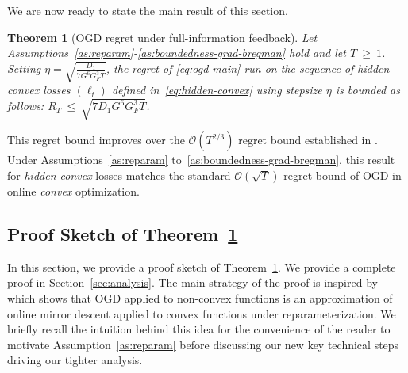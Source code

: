 \documentclass[a4paper,11pt,fullpage]{article}
\theoremstyle{plain}
\newtheorem{theorem}{Theorem}
\theoremstyle{definition}
\theoremstyle{plain}
\renewcommand{\leq}{~\le~}
\renewcommand{\geq}{~\ge~}
\begin{document}
We are now ready to state the main result of this section.

\begin{tcolorbox}[colframe=white!, top=2pt,left=2pt,right=2pt,bottom=2pt] 
\begin{theorem}[OGD regret under full-information feedback]
\label{thm:main}
Let Assumptions~\ref{as:reparam}-\ref{as:boundedness-grad-bregman} hold and let $T \geq 1$. Setting $\eta = \sqrt{\frac{D_1}{7 G^6 G_F^3 T}}$, 
the regret of \eqref{eq:ogd-main} run on the sequence of hidden-convex losses $(\ell_t)$ defined in~\eqref{eq:hidden-convex} using stepsize $\eta$ is bounded as follows: 
$R_T \leq \sqrt{7 D_1 G^6 G_F^3 T}$.
\end{theorem}
\end{tcolorbox}

This regret bound improves over the $\mathcal{O}(T^{2/3})$ regret bound established in \citet{ghai-lu-hazan22}. 
Under Assumptions~\ref{as:reparam} to~\ref{as:boundedness-grad-bregman}, this result for \textit{hidden-convex} losses matches the standard $\mathcal{O}(\sqrt{T})$ regret bound of OGD in online \textit{convex} optimization. 

\subsection{Proof Sketch of Theorem~\ref{thm:main}}
\label{subsec:full-info-proof-sketch}

In this section, we provide a proof sketch of Theorem~\ref{thm:main}. We provide a complete proof in Section~\ref{sec:analysis}. 
The main strategy of the proof is inspired by \citet{ghai-lu-hazan22} which shows that OGD applied to non-convex functions is an approximation of online mirror descent
applied to convex functions under reparameterization. We briefly recall the intuition behind 
this idea for the convenience of the reader to motivate Assumption~\ref{as:reparam} before discussing our new key technical steps 
driving our tighter analysis.\\ 
\end{document}
